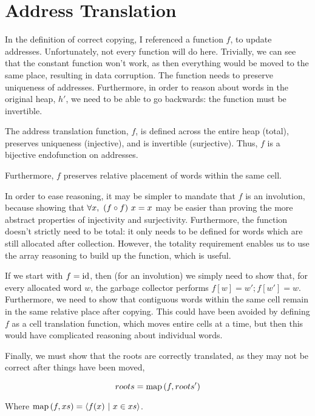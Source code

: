 \section{Address Translation}
\label{sec:copying-address}

In the definition of correct \gls{copying}, I referenced a function
$f$, to update addresses. Unfortunately, not every function will do
here. Trivially, we can see that the constant function won't work, as
then everything would be moved to the same place, resulting in data
corruption. The function needs to preserve uniqueness of
addresses. Furthermore, in order to reason about words in the original
\gls{heap}, $h'$, we need to be able to go backwards: the function
must be invertible.

\begin{definition}
  \label{def:c-address-translation-function}
  The address translation function, $f$, is defined across the entire
  heap (total), preserves uniqueness (injective), and is invertible
  (surjective). Thus, $f$ is a bijective endofunction on addresses.

  Furthermore, $f$ preserves relative placement of words within the
  same cell.
\end{definition}

In order to ease reasoning, it may be simpler to mandate that $f$ is
an involution, because showing that $\forall x,\ (f \circ f)~x = x$ may
be easier than proving the more abstract properties of injectivity and
surjectivity. Furthermore, the function doesn't strictly need to be
total: it only needs to be defined for words which are still allocated
after collection. However, the totality requirement enables us to use
the array reasoning to build up the function, which is useful.

If we start with $f = \mathrm{id}$, then (for an involution) we simply need to
show that, for every allocated word $w$, the \gls{garbage collector}
performs $f[w] = w'; f[w'] = w$. Furthermore, we need to show that
contiguous words within the same \gls{cell} remain in the same
relative place after copying. This could have been avoided by defining
$f$ as a cell translation function, which moves entire cells at a
time, but then this would have complicated reasoning about individual
words.

Finally, we must show that the roots are correctly translated, as they
may not be correct after things have been moved,

\begin{definition}
  \label{def:c-root-translation}
  \[roots = \mathrm{map}\left(f, roots'\right)\]

  Where $\mathrm{map}\left(f, xs\right) = \langle f(x)~|~x \in xs \rangle$.
\end{definition}

